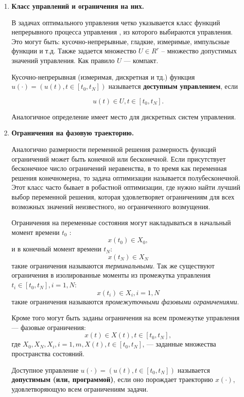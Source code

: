 \begin{enumerate}
    \item \textbf{Класс управлений и ограничения на них.}
    
    В задачах оптимального управления четко указывается класс функций  непрерывного процесса управления , из которого выбираются управления. Это могут быть: кусочно-непрерывные, гладкие, измеримые,  импульсные функции и т.д. Также задается множество $U \in R^r$ -- множество допустимых значений управления. Как правило $U$ — компакт.
    
    Кусочно-непрерывная (измеримая, дискретная и тд.) функция $u(·) = (u(t), t \in [t_0 , t_N ])$ называется \textbf{доступным управлением}, если 

\begin{equation} \label{eq_oc:diff}
	u(t) \in U, t \in [t_0 , t_N].
\end{equation}

Аналогичное определение имеет место для дискретных систем управления.


    \item \textbf{Ограничения на фазовую траекторию.}


Аналогично размерности переменной решения размерность функций ограничений может быть конечной или бесконечной. Если присутствует бесконечное число ограничений неравенства, в то время как переменная решения конечномерна, то задача оптимизации называется полубесконечной. Этот класс часто бывает в робастной оптимизации, где нужно найти лучший выбор переменной решения, которая удовлетворяет ограничениям для всех возможных значений неизвестного, но ограниченного возмущения.

 Ограничения на переменные состояния могут накладываться в начальный момент времени $t_0$ :
$$x(t_0) \in X_0,$$ и в конечный момент времени $t_N$:$$x(t_N) \in X_N$$
такие ограничения называются \textit{терминальными}. Так же существуют ограничения в изолированные моменты из промежутка управления $t_i \in [t_0 , t_N], i = 1, N$:
$$x(t_i) \in X_i , i = 1, N$$
такие ограничения называются \textit{промежуточными фазовыми ограничениями}.

Кроме того могут быть заданы ограничения на всем промежутке управления — фазовые ограничения: $$x(t) \in X(t), t \in [t_0 , t_N ],$$
где $X_0 , X_N , X_i , i = 1, m, X(t), t \in [t_0 , t_N ]$, — заданные множества пространства состояний.

Доступное управление $u(·) = (u(t), t \in [t_0 , t_N ])$ называется \textbf{допустимым (или, программой)}, если оно порождает траекторию $x(·)$, удовлетворяющую всем ограничениям задачи.
    

\end{enumerate}
